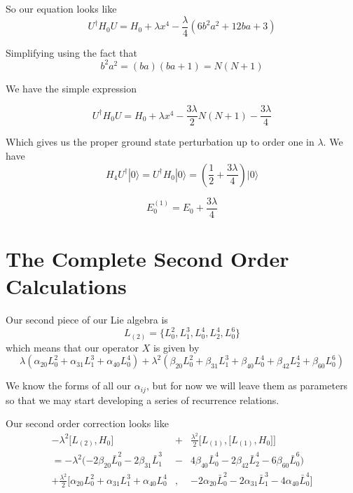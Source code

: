 \documentclass{article}
\newcommand{\lrbrack}[2]{\lbrack #1 , #2 \rbrack}
\begin{document}
So our equation looks like
\[
U^{\dagger}H_0 U = H_0 + \lambda x^4 - \frac{\lambda}{4}(6 b^2 a^2 + 12 ba + 3)
\]

Simplifying using the fact that
\[
b^2 a^2 = (ba)(ba+1) = N(N+1)
\]

We have the simple expression

\[
U^{\dagger}H_0 U = H_0 + \lambda x^4 - \frac{3\lambda}{2} N(N+1) - \frac{3\lambda}{4}
\]

Which gives us the proper ground state perturbation up to order one in $\lambda$.  We have
\[
H_4 U^{\dagger} |0\rangle = U^{\dagger} H_0 |0\rangle = \left(\frac{1}{2} + \frac{3\lambda}{4}\right) |0\rangle
\]


\begin{equation}
E_0^{(1)} = E_0 + \frac{3\lambda}{4}
\end{equation}


\section*{The Complete Second Order Calculations}


Our second piece of our Lie algebra is
\[
L_{(2)} = \{L_0^2,L_1^3,L_0^4,L_2^4,L_0^6 \}
\]
which means that our operator $X$ is given by
\[
\lambda(\alpha_{20}L_0^2 + \alpha_{31}L_1^3 + \alpha_{40}L_0^4) + \lambda^2(\beta_{20}L_0^2 + \beta_{31}L_1^3 + \beta_{40}L_0^4 +\beta_{42}L_2^4 + \beta_{60}L_0^6)
\]


We know the forms of all our $\alpha_{ij}$, but for now we will leave them as parameters so that we may start developing a series of recurrence relations.

Our second order correction looks like
\begin{eqnarray*}
-\lambda^2 \lrbrack{L_{(2)}}{H_0} & + & \frac{\lambda^2}{2} \lrbrack{L_{(1)}}{\lrbrack{L_{(1)}}{H_0}}\\
= -\lambda^2 (-2\beta_{20}\bar{L}_0^2 - 2\beta_{31}\bar{L}_1^3 &-& 4\beta_{40}\bar{L}_0^4 -2\beta_{42}\bar{L}_2^4 - 6\beta_{60}\bar{L}_0^6)\\
+ \frac{\lambda^2}{2}\lbrack{\alpha_{20}L_0^2 + \alpha_{31}L_1^3 + \alpha_{40}L_0^4}& ,& {-2\alpha_{20}\bar{L}_0^2 - 2\alpha_{31}\bar{L}_1^3 - 4\alpha_{40}\bar{L}_0^4}\rbrack 
\end{eqnarray*}
\end{document}
